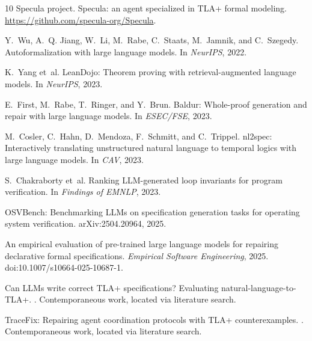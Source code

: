 \documentclass[11pt]{article}
\begin{document}
\begin{thebibliography}{10}
Specula project.
\newblock Specula: an agent specialized in TLA+ formal modeling.
\newblock \url{https://github.com/specula-org/Specula}.

Y.~Wu, A.~Q. Jiang, W.~Li, M.~Rabe, C.~Staats, M.~Jamnik, and C.~Szegedy.
\newblock Autoformalization with large language models.
\newblock In \emph{NeurIPS}, 2022.

K.~Yang et~al.
\newblock LeanDojo: Theorem proving with retrieval-augmented language models.
\newblock In \emph{NeurIPS}, 2023.

E.~First, M.~Rabe, T.~Ringer, and Y.~Brun.
\newblock Baldur: Whole-proof generation and repair with large language
  models.
\newblock In \emph{ESEC/FSE}, 2023.

M.~Cosler, C.~Hahn, D.~Mendoza, F.~Schmitt, and C.~Trippel.
\newblock nl2spec: Interactively translating unstructured natural language to
  temporal logics with large language models.
\newblock In \emph{CAV}, 2023.

S.~Chakraborty et~al.
\newblock Ranking LLM-generated loop invariants for program verification.
\newblock In \emph{Findings of EMNLP}, 2023.

OSVBench: Benchmarking LLMs on specification generation tasks for operating
  system verification.
\newblock arXiv:2504.20964, 2025.

An empirical evaluation of pre-trained large language models for repairing
  declarative formal specifications.
\newblock \emph{Empirical Software Engineering}, 2025.
\newblock doi:10.1007/s10664-025-10687-1.

Can LLMs write correct TLA+ specifications? Evaluating
  natural-language-to-TLA+.
. Contemporaneous work, located via literature search.

TraceFix: Repairing agent coordination protocols with TLA+ counterexamples.
. Contemporaneous work, located via literature search.

\end{thebibliography}
\end{document}
